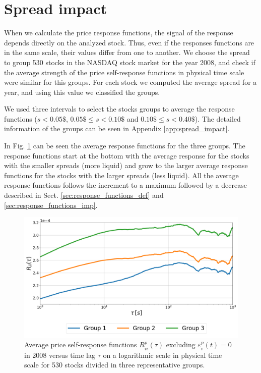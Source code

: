 \section{Spread impact}\label{sec:spread_impact}

When we calculate the price response functions, the signal of the response
depends directly on the analyzed stock. Thus, even if the responses functions
are in the same scale, their values differ from one to another. We choose the
spread to group 530 stocks in the NASDAQ stock market for the year 2008, and
check if the average strength of the price self-response functions in physical
time scale were similar for this groups. For each stock we computed the average
spread for a year, and using this value we classified the groups.

We used three intervals to select the stocks groups to average the response
functions ($s<0.05\$$, $0.05\$ \le s <0.10\$$ and $0.10\$ \le s <0.40\$$). The
detailed information of the groups can be seen in Appendix
\ref{app:spread_impact}.

In Fig. \ref{fig:spread_impact} can be seen the average response functions for
the three groups. The response functions start at the bottom with the average
response for the stocks with the smaller spreads (more liquid) and grow to the
larger average response functions for the stocks with the larger spreads (less
liquid). All the average response functions follows the increment to a maximum
followed by a decrease described in Sect. \ref{sec:response_functions_def} and
\ref{sec:response_functions_imp}.

\begin{figure}[htbp]
    \centering
    \includegraphics[width=\columnwidth]{figures/06_spread_impact_2008.png}
    \caption{Average price self-response functions
             $R^{p}_{ii}\left(\tau\right)$ excluding
             $\varepsilon^{p}_{i}\left(t\right) = 0$ in 2008 versus time lag
             $\tau$ on a logarithmic scale in physical time scale for 530
             stocks divided in three representative groups.}
    \label{fig:spread_impact}
\end{figure}

